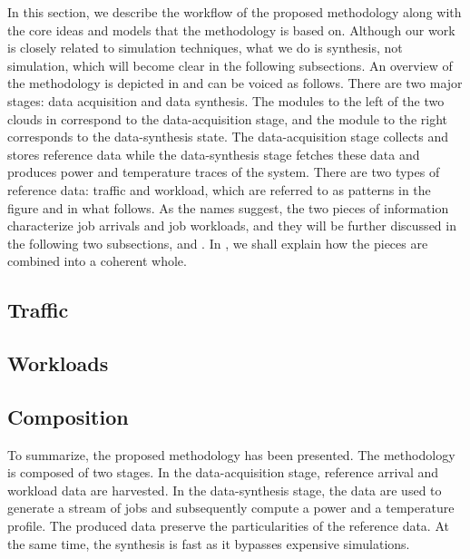 In this section, we describe the workflow of the proposed methodology along with
the core ideas and models that the methodology is based on. Although our work is
closely related to simulation techniques, what we do is synthesis, not
simulation, which will become clear in the following subsections. An overview of
the methodology is depicted in  and can be voiced as follows.
There are two major stages: data acquisition and data synthesis. The modules to
the left of the two clouds in  correspond to the
data-acquisition stage, and the module to the right corresponds to the
data-synthesis state. The data-acquisition stage collects and stores reference
data while the data-synthesis stage fetches these data and produces power and
temperature traces of the system. There are two types of reference data: traffic
and workload, which are referred to as patterns in the figure and in what
follows. As the names suggest, the two pieces of information characterize job
arrivals and job workloads, and they will be further discussed in the following
two subsections,  and . In , we
shall explain how the pieces are combined into a coherent whole.

\subsection{Traffic} 


\subsection{Workloads} 


\subsection{Composition} 


To summarize, the proposed methodology has been presented. The methodology is
composed of two stages. In the data-acquisition stage, reference arrival and
workload data are harvested. In the data-synthesis stage, the data are used to
generate a stream of jobs and subsequently compute a power and a temperature
profile. The produced data preserve the particularities of the reference data.
At the same time, the synthesis is fast as it bypasses expensive simulations.
